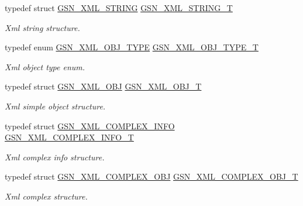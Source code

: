 \begin{DoxyCompactItemize}
typedef struct \hyperlink{a00436}{GSN\_\-XML\_\-STRING} \hyperlink{a00679_ga463f36b04e13c9f42e702c5a53312da8}{GSN\_\-XML\_\-STRING\_\-T}
\begin{DoxyCompactList}\small\item\em Xml string structure. \end{DoxyCompactList}\item 
typedef enum \hyperlink{a00679_gad31ca0a5bf81e8fbb6c9a048ef2c02c8}{GSN\_\-XML\_\-OBJ\_\-TYPE} \hyperlink{a00679_gaa26694299ab465dbf5806f74d06aedc9}{GSN\_\-XML\_\-OBJ\_\-TYPE\_\-T}
\begin{DoxyCompactList}\small\item\em Xml object type enum. \end{DoxyCompactList}\item 
typedef struct \hyperlink{a00435}{GSN\_\-XML\_\-OBJ} \hyperlink{a00679_ga158eab6806ea5fb00bc315226103c20a}{GSN\_\-XML\_\-OBJ\_\-T}
\begin{DoxyCompactList}\small\item\em Xml simple object structure. \end{DoxyCompactList}\item 
typedef struct \hyperlink{a00429}{GSN\_\-XML\_\-COMPLEX\_\-INFO} \hyperlink{a00679_gaa0d09c1190da464d384f10b95b4860eb}{GSN\_\-XML\_\-COMPLEX\_\-INFO\_\-T}
\begin{DoxyCompactList}\small\item\em Xml complex info structure. \end{DoxyCompactList}\item 
typedef struct \hyperlink{a00430}{GSN\_\-XML\_\-COMPLEX\_\-OBJ} \hyperlink{a00679_gacbfb0f478c8c0a699ae348b9ed1e5133}{GSN\_\-XML\_\-COMPLEX\_\-OBJ\_\-T}
\begin{DoxyCompactList}\small\item\em Xml complex structure. \end{DoxyCompactList}\end{DoxyCompactItemize}
